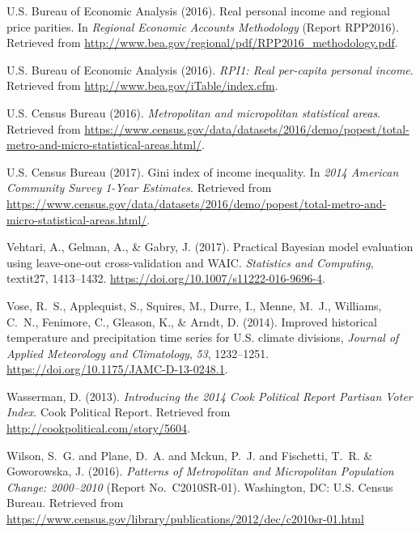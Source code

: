 \documentclass[draft]{agujournal}\usepackage{knitr}
\begin{document}
\begin{thebibliography}{33}
  U.S. Bureau of Economic Analysis (2016{}).
  Real personal income and regional price parities.
  In \textit{Regional Economic Accounts Methodology\/}
  (Report  RPP2016).
  Retrieved from
  \url{http://www.bea.gov/regional/pdf/RPP2016_methodology.pdf}.

  U.S. Bureau of Economic Analysis (2016{}).
  \textit{{RPI1}: Real per-capita personal income}.
  Retrieved from
  \url{http://www.bea.gov/iTable/index.cfm}.

  U.S. Census Bureau (2016).
  \textit{Metropolitan and micropolitan statistical areas}.
  Retrieved from
  \url{https://www.census.gov/data/datasets/2016/demo/popest/total-metro-and-micro-statistical-areas.html/}.

  {U.S. Census Bureau} (2017).
  Gini index of income inequality.
  In \textit{2014 American Community Survey 1-Year Estimates}.
  Retrieved from
  \url{https://www.census.gov/data/datasets/2016/demo/popest/total-metro-and-micro-statistical-areas.html/}.

  Vehtari, A., Gelman, A., \& Gabry, J. (2017).
  Practical {Bayesian} model evaluation using leave-one-out cross-validation and {WAIC}.
  \textit{Statistics and Computing}, textit{27}, 1413--1432.
  \url{https://doi.org/10.1007/s11222-016-9696-4}.

  Vose, R.~S., Applequist, S., Squires, M., Durre, I., Menne, M.~J., Williams, C.~N.,
  Fenimore, C., Gleason, K., \& Arndt, D. (2014).
  Improved historical temperature and precipitation time series for {U}.{S}.
  climate divisions,
  \textit{Journal of  Applied Meteorology and Climatology}, \textit{53}, 1232--1251.
  \url{https://doi.org/10.1175/JAMC-D-13-0248.1}.

  Wasserman, D. (2013).
  \textit{Introducing the 2014 {C}ook {P}olitical {R}eport {P}artisan {V}oter
  {I}ndex}.
  Cook Political Report.
  Retrieved from
  \url{http://cookpolitical.com/story/5604}.

  Wilson, S.~G. and Plane, D.~A. and Mckun, P.~J. and Fischetti, T.~R. \&
  Goworowska, J. (2016).
  \textit{Patterns of Metropolitan and Micropolitan Population Change: 2000--2010\/}
  (Report No.~C2010SR-01).
  Washington, DC:  U.S. Census Bureau.
  Retrieved from
  \url{https://www.census.gov/library/publications/2012/dec/c2010sr-01.html}

\end{thebibliography}

\listofchanges
\end{document}
